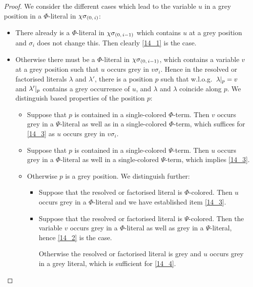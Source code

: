 \documentclass[,%
	draft=false,%
	numbers=noendperiod
	12pt,
	a4paper,
	oneside,%
	openany,
]{memoir}
\newcommand{\inv}{\ensuremath{\chi}}
\begin{document}
\begin{proof}
	We consider the different cases which lead to the variable $u$ in a grey position in a $\Phi$-literal in $\inv\sigmazi$:
	\begin{itemize}
		\item
			There already is a $\Phi$-literal in $\inv\sigmazmi$ which contains $u$ at a grey position and $\sigma_i$ does not change this. Then clearly \ref{14_1} is the case.

		\item
			Otherwise there must be a $\Phi$-literal in $\inv\sigmazmi$, which contains a variable $v$ at a grey position such that $u$ occurs grey in $v\sigma_i$.
			Hence in the resolved or factorised literals $\lambda$ and $\lambda'$, there is a position $p$ such that w.l.o.g.\ $\lambda|_{p} = v$ and $\lambda'|_{p}$ contains a grey occurrence of $u$, and $\lambda$ and $\lambda$ coincide along $p$.
			We distinguish based properties of the position $p$:

			\begin{itemize}
				\item
					Suppose that $p$ is contained in a single-colored $\Phi$-term.
					Then $v$ occurs grey in a $\Psi$-literal as well as in a single-colored $\Phi$-term, which suffices for \ref{14_3} as $u$ occurs grey in $v\sigma_i$.

				\item 
					Suppose that $p$ is contained in a single-colored $\Psi$-term.
					Then $u$ occurs grey in a $\Phi$-literal as well in a single-colored $\Psi$-term, which implies \ref{14_3}.

				\item
					Otherwise $p$ is a grey position.
					We distinguish further:

					\begin{itemize}
						\item Suppose that the resolved or factorised literal is $\Phi$-colored.
							Then $u$ occurs grey in a $\Phi$-literal and we have established item \ref{14_3}.

						\item Suppose that the resolved or factorised literal is $\Psi$-colored.
							Then the variable $v$ occurs grey in a $\Phi$-literal as well as grey in a $\Psi$-literal, hence \ref{14_2} is the case.

							Otherwise the resolved or factorised literal is grey and $u$ occurs grey in a grey literal, which is sufficient for \ref{14_4}.
							\qedhere
					\end{itemize}

			\end{itemize}

	\end{itemize}

\end{proof}
\end{document}
